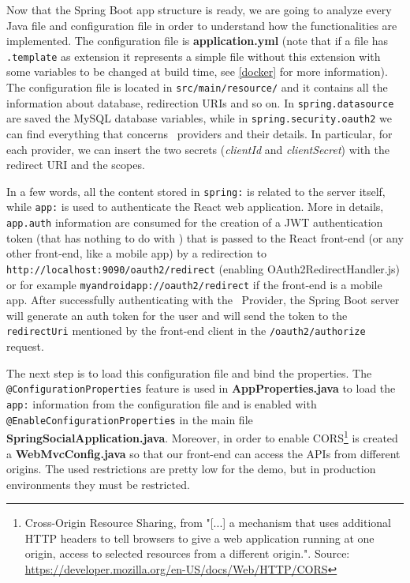 \noindent Now that the Spring Boot app structure is ready, we are going to analyze every Java file and configuration file in order to understand how the functionalities are implemented. The configuration file is \textbf{application.yml} (note that if a file has \texttt{.template} as extension it represents a simple file without this extension with some variables to be changed at build time, see \ref{docker} for more information). The configuration file is located in \texttt{src/main/resource/} and it contains all the information about database, redirection URIs and so on. In \texttt{spring.datasource} are saved the MySQL database variables, while in \texttt{spring.security.oauth2} we can find everything that concerns \oauth\ providers and their details. In particular, for each provider, we can insert the two secrets (\textit{clientId} and \textit{clientSecret}) with the redirect URI and the scopes.

In a few words, all the content stored in \texttt{spring:} is related to the server itself, while \texttt{app:} is used to authenticate the React web application. More in details, \texttt{app.auth} information are consumed for the creation of a JWT authentication token (that has nothing to do with \oauth) that is passed to the React front-end (or any other front-end, like a mobile app) by a redirection to \\ \texttt{http://localhost:9090/oauth2/redirect} (enabling OAuth2RedirectHandler.js) or for example \texttt{myandroidapp://oauth2/redirect} if the front-end is a mobile app.
After successfully authenticating with the \oauth\ Provider, the Spring Boot server will generate an auth token for the user and will send the token to the \texttt{redirectUri} mentioned by the front-end client in the \texttt{/oauth2/authorize} request. 

The next step is to load this configuration file and bind the properties. The \\ \texttt{@ConfigurationProperties} feature is used in \textbf{AppProperties.java} to load the \texttt{app:} information from the configuration file and is enabled with  \texttt{@EnableConfigurationProperties} in the main file \textbf{SpringSocialApplication.java}. Moreover, in order to enable CORS\footnote{Cross-Origin Resource Sharing, from "[...] a mechanism that uses additional HTTP headers to tell browsers to give a web application running at one origin, access to selected resources from a different origin.". Source: \url{https://developer.mozilla.org/en-US/docs/Web/HTTP/CORS}} is created a \textbf{WebMvcConfig.java}  so that our front-end can access the APIs from different origins. The used restrictions are pretty low for the demo, but in production environments they must be restricted.

